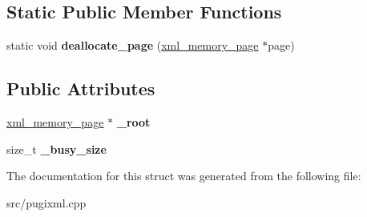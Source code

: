 \subsection*{Static Public Member Functions}
\begin{DoxyCompactItemize}
\item 
\mbox{\label{structxml__allocator_a1c6bfe15a257a094f55659f8d71c209e}} 
static void {\bfseries deallocate\+\_\+page} (\hyperlink{structxml__memory__page}{xml\+\_\+memory\+\_\+page} $\ast$page)
\end{DoxyCompactItemize}
\subsection*{Public Attributes}
\begin{DoxyCompactItemize}
\item 
\mbox{\label{structxml__allocator_a38082e85b23743620a257f997a00bb69}} 
\hyperlink{structxml__memory__page}{xml\+\_\+memory\+\_\+page} $\ast$ {\bfseries \+\_\+root}
\item 
\mbox{\label{structxml__allocator_a4908b4aaa8cbbc3bf936ab8a938053c0}} 
size\+\_\+t {\bfseries \+\_\+busy\+\_\+size}
\end{DoxyCompactItemize}


The documentation for this struct was generated from the following file\+:\begin{DoxyCompactItemize}
\item 
src/pugixml.\+cpp\end{DoxyCompactItemize}
